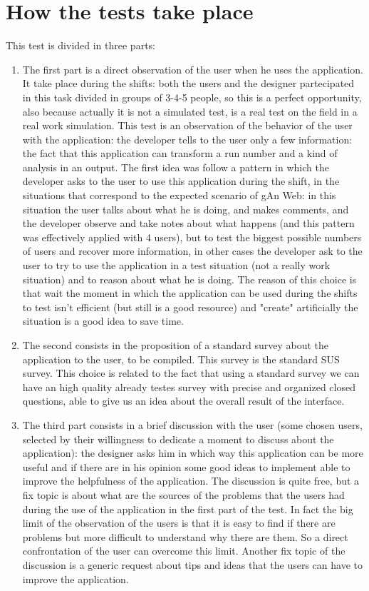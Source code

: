 \section{How the tests take place} 

This test is divided in three parts: 
\begin{enumerate}
\item
The first part is a direct observation of the user when he uses the application. It take place during the shifts: both the users and the designer partecipated in this task divided in groups of 3-4-5 people, so this is a perfect opportunity, also because actually it is not a simulated test, is a real test on the field in a real work simulation. This test is an observation of the behavior of the user with the application: the developer tells to the user only a few information: the fact that this application can transform a run number and a kind of analysis in an output. 
The first idea was follow a pattern in which the developer asks to the user to use this application during the shift, in the situations that correspond to the expected scenario of gAn Web: in this situation the user talks about what he is doing, and makes comments, and the developer observe and take notes about what happens (and this pattern was effectively applied with 4 users), but to test the biggest possible numbers of users and recover more information, in other cases the developer ask to the user to try to use the application in a test situation (not a really work situation) and to reason about what he is doing. The reason of this choice is that wait the moment in which the application can be used during the shifts to test isn't efficient (but still is a good resource) and "create" artificially the situation is a good idea to save time.

\item
The second consists in the proposition of a standard survey about the application to the user, to be compiled. This survey is the standard SUS survey. This choice is related to the fact that using a standard survey we can have an high quality already testes survey with precise and organized closed questions, able to give us an idea about the overall result of the interface. 

\item 
The third part consists in a brief discussion with the user (some chosen users, selected by their willingness to dedicate a moment to discuss about the application): the designer asks him in which way this application can be more useful and if there are in his opinion some good ideas to implement able to improve the helpfulness of the application. The discussion is quite free, but a fix topic is about what are the sources of the problems that the users had during the use of the application in the first part of the test. In fact the big limit of the observation of the users is that it is easy to find if there are problems but more difficult to understand why there are them. So a direct confrontation of the user can overcome this limit. Another fix topic of the discussion is a generic request about tips and ideas that the users can have to improve the application. 

\end{enumerate} 

